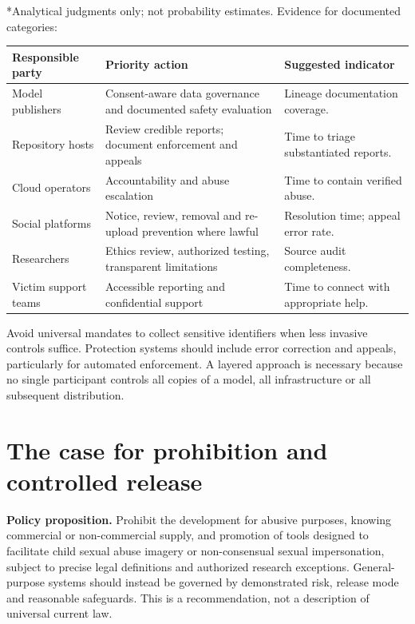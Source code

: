 \documentclass[10pt,a4paper]{article}
\begin{document}
*Analytical judgments only; not probability estimates. Evidence for documented categories:  \cite{iwf,ncmec25,fbi,meta,ftcads}


\begin{center}\small\begin{tabularx}{\linewidth}{@{}YYY@{}}\toprule
\textbf{Responsible party} & \textbf{Priority action} & \textbf{Suggested indicator}\\\midrule
Model publishers & Consent-aware data governance and documented safety evaluation & Lineage documentation coverage.\\
Repository hosts & Review credible reports; document enforcement and appeals & Time to triage substantiated reports.\\
Cloud operators & Accountability and abuse escalation & Time to contain verified abuse.\\
Social platforms & Notice, review, removal and re-upload prevention where lawful & Resolution time; appeal error rate.\\
Researchers & Ethics review, authorized testing, transparent limitations & Source audit completeness.\\
Victim support teams & Accessible reporting and confidential support & Time to connect with appropriate help.\\\bottomrule\end{tabularx}\end{center}

Avoid universal mandates to collect sensitive identifiers when less invasive controls suffice. Protection systems should include error correction and appeals, particularly for automated enforcement. A layered approach is necessary because no single participant controls all copies of a model, all infrastructure or all subsequent distribution.



\section{The case for prohibition and controlled release}
\textbf{Policy proposition.} Prohibit the development for abusive purposes, knowing commercial or non-commercial supply, and promotion of tools designed to facilitate child sexual abuse imagery or non-consensual sexual impersonation, subject to precise legal definitions and authorized research exceptions. General-purpose systems should instead be governed by demonstrated risk, release mode and reasonable safeguards. This is a recommendation, not a description of universal current law.
\end{document}
